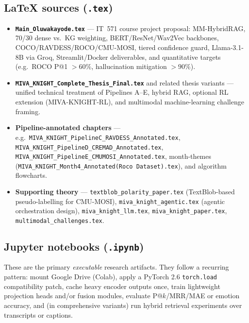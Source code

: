 \documentclass[11pt,a4paper]{article}
\begin{document}
\subsection{\LaTeX{} sources (\texttt{.tex})}
\begin{itemize}[leftmargin=1.5em]
  \item \textbf{\texttt{Main\_Oluwakayode.tex}} --- IT~571 course project proposal: MM-HybridRAG, 70/30 dense vs.\ KG weighting, BERT/ResNet/Wav2Vec backbones, COCO/RAVDESS/ROCO/CMU-MOSI, tiered confidence guard, Llama-3.1-8B via Groq, Streamlit/Docker deliverables, and quantitative targets (e.g.\ ROCO P@1 $>60\%$, hallucination mitigation $>90\%$).
  \item \textbf{\texttt{MIVA\_KNIGHT\_Complete\_Thesis\_Final.tex}} and related thesis variants --- unified technical treatment of Pipelines A--E, hybrid RAG, optional RL extension (MIVA-KNIGHT-RL), and multimodal machine-learning challenge framing.
  \item \textbf{Pipeline-annotated chapters} --- e.g.\ \texttt{MIVA\_KNIGHT\_PipelineC\_RAVDESS\_Annotated.tex}, \texttt{MIVA\_KNIGHT\_PipelineD\_CREMAD\_Annotated.tex}, \texttt{MIVA\_KNIGHT\_PipelineE\_CMUMOSI\_Annotated.tex}, month-themes (\texttt{MIVA\_KNIGHT\_Month4\_Annotated(Roco Dataset).tex}), and algorithm flowcharts.
  \item \textbf{Supporting theory} --- \texttt{textblob\_polarity\_paper.tex} (TextBlob-based pseudo-labelling for CMU-MOSI), \texttt{miva\_knight\_agentic.tex} (agentic orchestration design), \texttt{miva\_knight\_llm.tex}, \texttt{miva\_knight\_paper.tex}, \texttt{multimodal\_challenges.tex}.
\end{itemize}

\subsection{Jupyter notebooks (\texttt{.ipynb})}
These are the primary \emph{executable} research artifacts. They follow a recurring pattern: mount Google Drive (Colab), apply a PyTorch 2.6 \texttt{torch.load} compatibility patch, cache heavy encoder outputs once, train lightweight projection heads and/or fusion modules, evaluate P@$k$/MRR/MAE or emotion accuracy, and (in comprehensive variants) run hybrid retrieval experiments over transcripts or captions.
\end{document}
